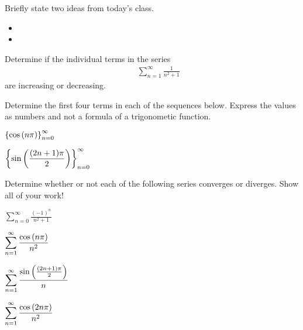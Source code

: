 \postClass

\begin{problem}
\item Briefly state two ideas from today's class.
  \begin{itemize}
  \item
  \item
  \end{itemize}
\item
  \begin{subproblem}
    \item
  \end{subproblem}
\end{problem}



\begin{problem}
\item Determine if the individual terms in the series
  \begin{eqnarray*}
    & & \sum^\infty_{n=1} \frac{1}{n^2+1}
  \end{eqnarray*}
  are increasing or decreasing.

    \vfill


  \item  Determine the first four terms in each of the sequences below. Express the values as numbers and not a formula of a trigonometic function.
    \begin{subproblem}
      \item $\displaystyle \left\{ \cos\left( n\pi \right)\right\}_{n=0}^\infty$
        \vfill
      \item $\displaystyle \left\{ \sin\left( \frac{(2n+1)\pi}{2}\right)\right\}_{n=0}^\infty$
        \vfill
    \end{subproblem}
\end{problem}


\begin{problem}
\item Determine whether or not each of the following series converges
  or diverges. Show all of your work!
  \begin{subproblem}
    \item $\displaystyle \sum_{n=0}^\infty \frac{(-1)^n}{n^2+1}$
      \vfill
    \item $\displaystyle \sum_{n=1}^\infty \frac{\cos\left( n\pi \right)}{n^2}$
      \vfill
      \clearpage
    \item $\displaystyle \sum_{n=1}^\infty \frac{\sin\left(\frac{(2n+1)\pi}{2}\right)}{n} $
      \vfill
    \item $\displaystyle \sum_{n=1}^\infty \frac{\cos\left( 2n\pi \right)}{n^2}$
      \vfill
  \end{subproblem}
\end{problem}


